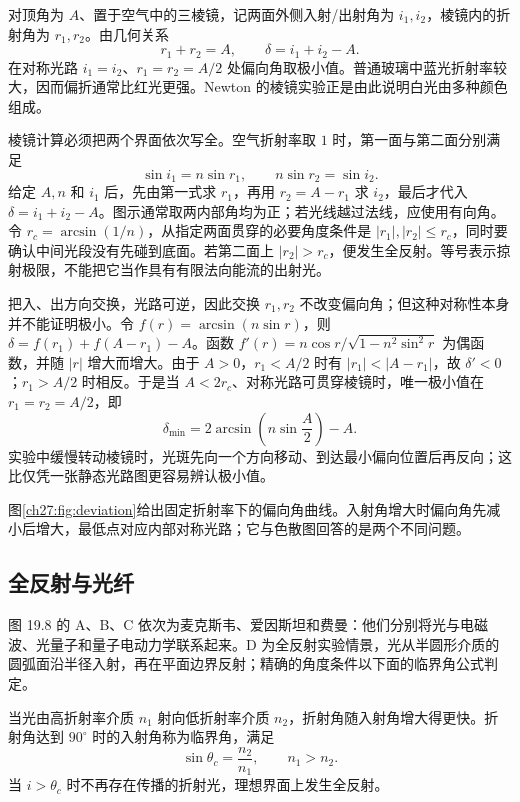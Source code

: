 对顶角为 $A$、置于空气中的三棱镜，记两面外侧入射/出射角为 $i_1,i_2$，棱镜内的折射角为 $r_1,r_2$。由几何关系
\begin{equation}
 r_1+r_2=A,\qquad \delta=i_1+i_2-A.
\end{equation}
在对称光路 $i_1=i_2$、$r_1=r_2=A/2$ 处偏向角取极小值。普通玻璃中蓝光折射率较大，因而偏折通常比红光更强。Newton 的棱镜实验正是由此说明白光由多种颜色组成。

棱镜计算必须把两个界面依次写全。空气折射率取 $1$ 时，第一面与第二面分别满足
\[
 \sin i_1=n\sin r_1,\qquad n\sin r_2=\sin i_2.
\]
给定 $A,n$ 和 $i_1$ 后，先由第一式求 $r_1$，再用 $r_2=A-r_1$ 求 $i_2$，最后才代入 $\delta=i_1+i_2-A$。图示通常取两内部角均为正；若光线越过法线，应使用有向角。令 $r_c=\arcsin(1/n)$，从指定两面贯穿的必要角度条件是 $|r_1|,|r_2|\le r_c$，同时要确认中间光段没有先碰到底面。若第二面上 $|r_2|>r_c$，便发生全反射。等号表示掠射极限，不能把它当作具有有限法向能流的出射光。

把入、出方向交换，光路可逆，因此交换 $r_1,r_2$ 不改变偏向角；但这种对称性本身并不能证明极小。令 $f(r)=\arcsin(n\sin r)$，则 $\delta=f(r_1)+f(A-r_1)-A$。函数 $f'(r)=n\cos r/\sqrt{1-n^2\sin^2r}$ 为偶函数，并随 $|r|$ 增大而增大。由于 $A>0$，$r_1<A/2$ 时有 $|r_1|<|A-r_1|$，故 $\delta'<0$；$r_1>A/2$ 时相反。于是当 $A<2r_c$、对称光路可贯穿棱镜时，唯一极小值在 $r_1=r_2=A/2$，即
\[
 \delta_{\min}=2\arcsin\!\left(n\sin\frac A2\right)-A.
\]
实验中缓慢转动棱镜时，光斑先向一个方向移动、到达最小偏向位置后再反向；这比仅凭一张静态光路图更容易辨认极小值。

\RefractionPrismPanel

图\ref{ch27:fig:deviation}给出固定折射率下的偏向角曲线。入射角增大时偏向角先减小后增大，最低点对应内部对称光路；它与色散图回答的是两个不同问题。
\PrismDeviationDiagram

\subsection*{全反射与光纤}

图 19.8 的 A、B、C 依次为麦克斯韦、爱因斯坦和费曼：他们分别将光与电磁波、光量子和量子电动力学联系起来。D 为全反射实验情景，光从半圆形介质的圆弧面沿半径入射，再在平面边界反射；精确的角度条件以下面的临界角公式判定。

当光由高折射率介质 $n_1$ 射向低折射率介质 $n_2$，折射角随入射角增大得更快。折射角达到 $90^\circ$ 时的入射角称为临界角，满足
\begin{equation}
  \sin\theta_c=\frac{n_2}{n_1},\qquad n_1>n_2.
\end{equation}
当 $i>\theta_c$ 时不再存在传播的折射光，理想界面上发生全反射。

